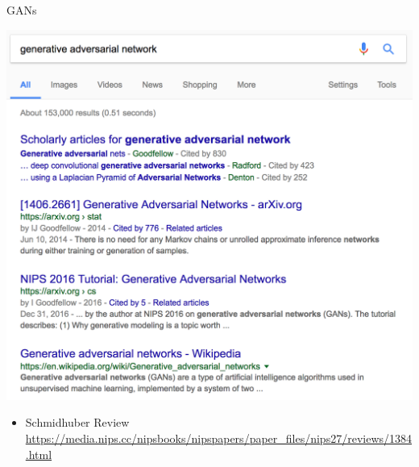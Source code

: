 \documentclass{beamer}
\begin{document}
\begin{frame}{GANs}{}

  \begin{center}
    \includegraphics[height=0.6\textheight]{google_gan}
  \end{center}
  
  \begin{itemize}
  \item {
    Schmidhuber Review \url{https://media.nips.cc/nipsbooks/nipspapers/paper_files/nips27/reviews/1384.html}
  }
  \end{itemize}

\end{frame}
\end{document}
